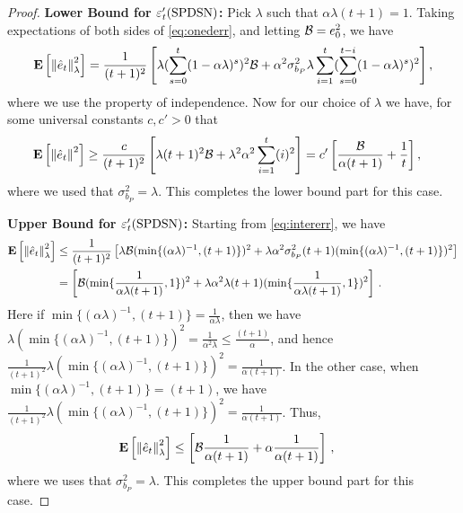 \begin{proof}
\textbf{Lower Bound for $\varepsilon_t'(\mathrm{SPDSN})$:}
Pick $\lambda$ such that $\alpha \lambda (t+1)=1$. 
Taking expectations of both sides of \eqref{eq:onederr}, and letting $\mathcal{B}=e_0^2$, we have
\begin{align}\label{eq:intererr}
\mathbf{E}\left[\left\| \hat{e}_t\right\|^2_{\lambda}\right]=\frac{1}{(t+1)^2}\left[ \lambda (\sum_{s=0}^t(1-\alpha \lambda)^s)^2 \mathcal{B}+ \alpha^2\sigma^2_{b_P}\lambda \sum_{i=1}^t (\sum_{s=0}^{t-i} (1-\alpha \lambda)^s)^2\right],
\end{align}
where we use the property of independence. Now for our choice of $\lambda$ we have, for some universal constants $c,c'>0$ that
\begin{align}
\mathbf{E}\left[\left\| \hat{e}_t\right\|^2\right]&\geq \frac{c}{(t+1)^2}\left[ \lambda (t+1)^2 \mathcal{B}+ \lambda^2 \alpha^2  \sum_{i=1}^t (i)^2\right]
= c' \left[\frac{\mathcal{B}}{\alpha (t+1)}+   \frac{1}{t} \right],
\end{align}
where we used that $\sigma^2_{b_P}=\lambda$. This completes the lower bound part for this case.

\textbf{Upper Bound for $\varepsilon_t'(\mathrm{SPDSN})$:}
Starting from \eqref{eq:intererr}, we have
\begin{align}
\mathbf{E}\left[\left\| \hat{e}_t\right\|^2_{\lambda}\right]
&\leq \frac{1}{(t+1)^2}\left[\lambda \mathcal{B} 
	(\min\{(\alpha\lambda)^{-1},(t+1)\})^2
		+ \lambda \alpha^2 \sigma^2_{b_P} (t+1) (\min\{(\alpha\lambda)^{-1},(t+1)\})^2 \right]\\
&= \left[\mathcal{B} 
	(\min\{\frac{1}{\alpha \lambda (t+1)},1\})^2
		+ \lambda \alpha^2 \lambda (t+1) (\min\{\frac{1}{\alpha \lambda (t+1)},1\})^2 \right]\,.
\end{align}
Here if 
$\min\{(\alpha\lambda)^{-1},(t+1)\} = \frac{1}{\alpha \lambda}$, 
then we have 
$\lambda(\min\{(\alpha\lambda)^{-1},(t+1)\})^2
	=\frac{1}{\alpha^2 \lambda}\leq \frac{(t+1)}{\alpha}$, 
	and hence 
$\frac{1}{(t+1)^2} \lambda(\min\{(\alpha\lambda)^{-1},(t+1)\})^2
						=\frac{1}{\alpha (t+1)}$. 
In the other case, when $\min\{(\alpha\lambda)^{-1},(t+1)\}=(t+1)$, we have
	$\frac{1}{(t+1)^2}\lambda(\min\{(\alpha\lambda)^{-1},(t+1)\})^2=\frac{1}{\alpha (t+1)}$. 
Thus,
\begin{align}
\mathbf{E}\left[\left\| \hat{e}_t\right\|^2_{\lambda}\right]
	&\leq \left[\mathcal{B} \frac{1}{\alpha (t+1)}+ \alpha \frac{1}{\alpha (t+1)} \right]\,,
\end{align}
where we uses that $\sigma^2_{b_P}=\lambda$. This completes the upper bound part for this case.
\end{proof}
